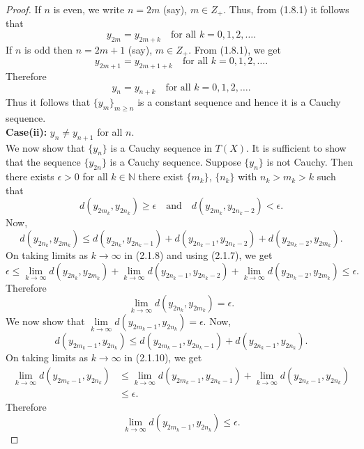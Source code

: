 \documentclass[11]{article}
\numberwithin{equation}{definition}
\begin{document}
\begin{proof}
If $n$ is even, we write $n = 2m$ (say), $m \in Z_+$.
Thus, from (1.8.1) it follows that
\[
y_{2m} = y_{2m+k} \quad \text{for all } k = 0, 1, 2, \ldots.
\]
If $n$ is odd then $n = 2m + 1$ (say), $m \in Z_+$.
From (1.8.1), we get
\[
y_{2m+1} = y_{2m+1+k} \quad \text{for all } k = 0, 1, 2, \ldots.
\]
Therefore
\[
y_n = y_{n+k} \quad \text{for all } k = 0, 1, 2, \ldots.
\]
Thus it follows that $\{y_m\}_{m\geq n}$ is a constant sequence and hence it is a Cauchy sequence.\\
\textbf{Case(ii):}  $y_n \neq y_{n+1}$ for all $n$.\\
We now show that $\{y_n\}$ is a Cauchy sequence in $T(X)$.
It is sufficient to show that the sequence $\{y_{2n}\}$ is a Cauchy sequence.
Suppose $\{y_n\}$ is not Cauchy. Then there exists $\epsilon > 0$ for all $k \in \mathbb{N}$ there exist $\{m_k\}$, $\{n_k\}$ with $n_k > m_k > k$ such that
\begin{equation}
d(y_{2m_k}, y_{2n_k}) \geq \epsilon \quad \text{and} \quad d(y_{2m_k}, y_{2n_k-2}) < \epsilon.
\end{equation}
Now,
\begin{equation}
d(y_{2n_k}, y_{2m_k}) \leq d(y_{2n_k}, y_{2n_k-1}) + d(y_{2n_k-1}, y_{2n_k-2}) + d(y_{2n_k-2}, y_{2m_k}).
\end{equation}
On taking limits as $k \to \infty$ in (2.1.8) and using (2.1.7), we get
\[
\epsilon \leq \lim_{k\to\infty}d(y_{2n_k}, y_{2m_k}) + \lim_{k\to\infty}d(y_{2n_k-1}, y_{2n_k-2}) + \lim_{k\to\infty}d(y_{2n_k-2}, y_{2m_k}) \leq \epsilon.
\]
Therefore
\begin{equation}
\lim_{k\to\infty}d(y_{2n_k}, y_{2m_k}) = \epsilon.
\end{equation}
We now show that $\lim\limits_{k\to\infty}d(y_{2m_k-1}, y_{2n_k}) = \epsilon$.
Now,
\begin{equation}
d(y_{2m_k-1}, y_{2n_k}) \leq d(y_{2m_k-1}, y_{2n_k-1}) + d(y_{2n_k-1}, y_{2n_k}).
\end{equation}
On taking limits as $k\to\infty$ in (2.1.10), we get
\begin{align*}
\lim_{k\to\infty}d(y_{2m_{k}-1},y_{2n_{k}}) &\leq \lim_{k\to\infty}d(y_{2m_{k}-1},y_{2n_{k}-1})+\lim_{k\to\infty}d(y_{2n_{k}-1},y_{2n_{k}}) \\
&\leq \epsilon.
\end{align*}
Therefore
\begin{equation}
\lim_{k\to\infty}d(y_{2m_{k}-1},y_{2n_{k}}) \leq \epsilon.
\end{equation}

\end{proof}
\end{document}
